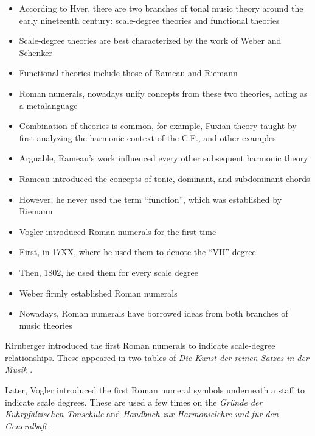 
\begin{itemize}
    \item According to Hyer, there are two branches of tonal music theory around the early nineteenth century: scale-degree theories and functional theories
    \item Scale-degree theories are best characterized by the work of Weber and Schenker
    \item Functional theories include those of Rameau and Riemann
    \item Roman numerals, nowadays unify concepts from these two theories, acting as a metalanguage
    \item Combination of theories is common, for example, Fuxian theory taught by first analyzing the harmonic context of the C.F., and other examples
    \item Arguable, Rameau's work influenced every other subsequent harmonic theory
    \item Rameau introduced the concepts of tonic, dominant, and subdominant chords
    \item However, he never used the term ``function'', which was established by Riemann
    \item Vogler introduced Roman numerals for the first time
    \item First, in 17XX, where he used them to denote the ``VII'' degree
    \item Then, 1802, he used them for every scale degree
    \item Weber firmly established Roman numerals
    \item Nowadays, Roman numerals have borrowed ideas from both branches of music theories
\end{itemize}

Kirnberger introduced the first Roman numerals to indicate scale-degree relationships.
These appeared in two tables of \emph{Die Kunst der reinen Satzes in der Musik} \cite{kirnberger1774kunst}.

Later, Vogler introduced the first Roman numeral symbols underneath a staff to indicate scale degrees.
These are used a few times on the \emph{Gründe der Kuhrpfälzischen Tonschule} and \emph{Handbuch zur Harmonielehre und für den Generalbaß} \cite{vogler1778grunde, vogler1802handbuch}.


